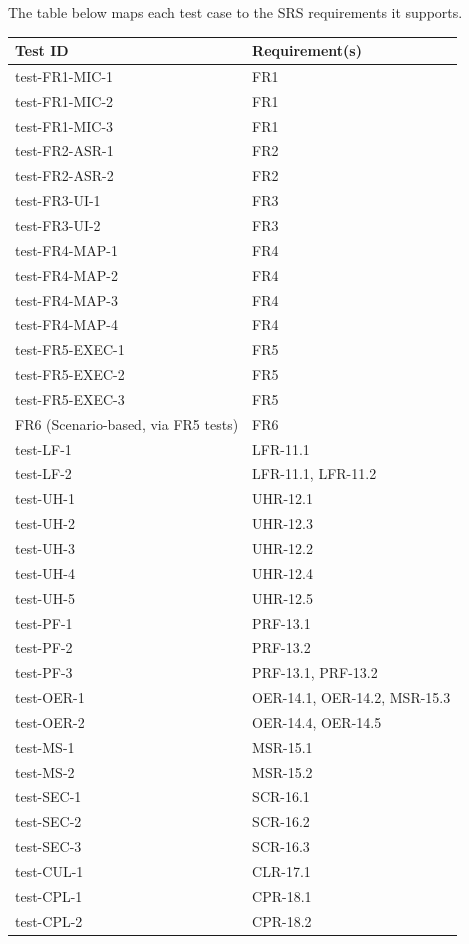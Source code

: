 \documentclass[12pt, titlepage]{article}
\begin{document}
The table below maps each test case to the SRS requirements it supports.

\begin{center}
\renewcommand{\arraystretch}{1.15}
\begin{tabular}{|l|l|}
\hline
\textbf{Test ID} & \textbf{Requirement(s)} \\
\hline
test-FR1-MIC-1 & FR1 \\
test-FR1-MIC-2 & FR1 \\
test-FR1-MIC-3 & FR1 \\
test-FR2-ASR-1 & FR2 \\
test-FR2-ASR-2 & FR2 \\
test-FR3-UI-1 & FR3 \\
test-FR3-UI-2 & FR3 \\
test-FR4-MAP-1 & FR4 \\
test-FR4-MAP-2 & FR4 \\
test-FR4-MAP-3 & FR4 \\
test-FR4-MAP-4 & FR4 \\
test-FR5-EXEC-1 & FR5 \\
test-FR5-EXEC-2 & FR5 \\
test-FR5-EXEC-3 & FR5 \\
FR6 (Scenario-based, via FR5 tests) & FR6 \\
test-LF-1 & LFR-11.1 \\
test-LF-2 & LFR-11.1, LFR-11.2 \\
test-UH-1 & UHR-12.1 \\
test-UH-2 & UHR-12.3 \\
test-UH-3 & UHR-12.2 \\
test-UH-4 & UHR-12.4 \\
test-UH-5 & UHR-12.5 \\
test-PF-1 & PRF-13.1 \\
test-PF-2 & PRF-13.2 \\
test-PF-3 & PRF-13.1, PRF-13.2 \\
test-OER-1 & OER-14.1, OER-14.2, MSR-15.3 \\
test-OER-2 & OER-14.4, OER-14.5 \\
test-MS-1 & MSR-15.1 \\
test-MS-2 & MSR-15.2 \\
test-SEC-1 & SCR-16.1 \\
test-SEC-2 & SCR-16.2 \\
test-SEC-3 & SCR-16.3 \\
test-CUL-1 & CLR-17.1 \\
test-CPL-1 & CPR-18.1 \\
test-CPL-2 & CPR-18.2 \\
\hline
\end{tabular}
\end{center}
\end{document}
